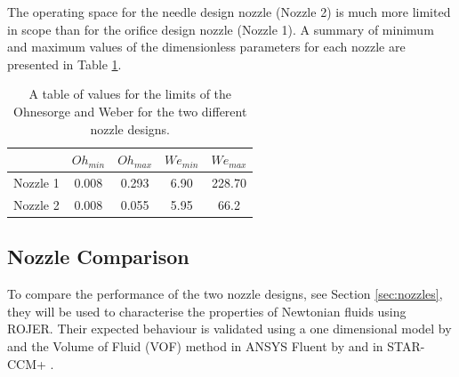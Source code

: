 \documentclass[11pt]{article}
\begin{document}
The operating space for the needle design nozzle (Nozzle 2) is much more limited in scope than for the orifice design nozzle (Nozzle 1). A summary of minimum and maximum values of the dimensionless parameters for each nozzle are presented in Table \ref{tbl:operability}. 
\begin{table}[h]
\centering
\begin{tabular}{c|c|c|c|c|}
\cline{2-5}
                               & $Oh_{min}$ & $Oh_{max}$ & $We_{min}$ & $We_{max}$ \\ \hline
\multicolumn{1}{|c|}{Nozzle 1} & 0.008      & 0.293      & 6.90       & 228.70     \\ \hline
\multicolumn{1}{|c|}{Nozzle 2} & 0.008      & 0.055      & 5.95       & 66.2       \\ \hline
\end{tabular}
\caption{A table of values for the limits of the Ohnesorge and Weber for the two different nozzle designs.}
\label{tbl:operability}
\end{table}

\subsection{Nozzle Comparison}
To compare the performance of the two nozzle designs, see Section \ref{sec:nozzles}, they will be used to characterise the properties of Newtonian fluids using ROJER. Their expected behaviour is validated using a one dimensional model by \cite{hall2015report} and the Volume of Fluid (VOF) method in ANSYS Fluent by \cite{greiciunas2015report} and in STAR-CCM+ \citep{gorbatenko2015report}.
\end{document}
